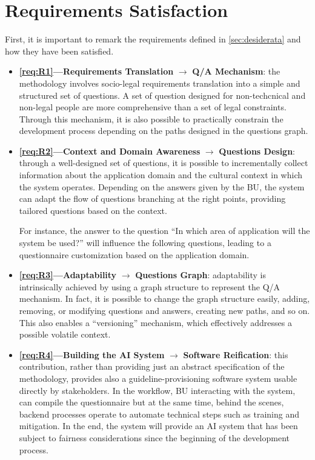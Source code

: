 \documentclass[12pt,a4paper,openright,twoside]{book}
\begin{document}
\section{Requirements Satisfaction}

First, it is important to remark the requirements defined in \cref{sec:desiderata} and how they have been satisfied.

\begin{itemize}[label={}]

    \item \textbf{\ref{req:R1}---Requirements Translation} $\rightarrow$ \textbf{\ac{Q/A} Mechanism}:
    the methodology involves socio-legal requirements translation into a simple and structured set of questions. 
    A set of question designed for non-techcnical and non-legal people are more comprehensive than a set of legal constraints.
    Through this mechanism, it is also possible to practically constrain the development process depending on the paths designed in the questions graph.

    \item \textbf{\ref{req:R2}---Context and Domain Awareness} $\rightarrow$ \textbf{Questions Design}:
    through a well-designed set of questions, it is possible to incrementally collect information about the application domain and the cultural context in which the system operates.
    Depending on the answers given by the \ac{BU}, the system can adapt the flow of questions branching at the right points, providing tailored questions based on the context.
    
    For instance, the answer to the question ``In which area of application will the system be used?'' will influence the following questions, leading to a questionnaire customization based on the application domain.

    \item \textbf{\ref{req:R3}---Adaptability} $\rightarrow$ \textbf{Questions Graph}:
    adaptability is intrinsically achieved by using a graph structure to represent the \ac{Q/A} mechanism.
    In fact, it is possible to change the graph structure easily, adding, removing, or modifying questions and answers, creating new paths, and so on.
    This also enables a ``versioning'' mechanism, which effectively addresses a possible volatile context.
    
    \item \textbf{\ref{req:R4}---Building the AI System} $\rightarrow$ \textbf{Software Reification}:
    this contribution, rather than providing just an abstract specification of the methodology, provides also a guideline-provisioning software system usable directly by stakeholders.
    In the workflow, \ac{BU} interacting with the system, can compile the questionnaire but at the same time, behind the scenes, backend processes operate to automate technical steps such as training and mitigation.
    In the end, the system will provide an \ac{AI} system that has been subject to fairness considerations since the beginning of the development process.
\end{itemize}
\end{document}
